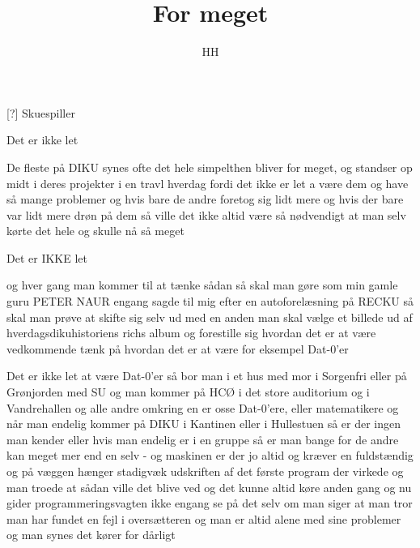\documentclass[a4paper,11pt]{article}
\title{For meget}
\author{HH}
\begin{document}
\maketitle

\begin{roles}
[?] Skuespiller 
\end{roles}


\begin{sketch}

 Det er ikke let

         De fleste på DIKU synes ofte det hele simpelthen bliver for
                meget, og standser op midt i deres projekter
                i en travl hverdag fordi det ikke er let a
                være dem og have så mange problemer
         og hvis bare de andre foretog sig lidt mere og hvis der bare
                var lidt mere drøn på dem
         så ville det ikke altid være så nødvendigt at man selv kørte
                det hele og skulle nå så meget

         Det er IKKE let
         
         og hver gang man kommer til at tænke sådan
         så skal man gøre som min gamle guru PETER NAUR engang
                sagde til mig efter en autoforelæsning på RECKU
         så skal man prøve at skifte sig selv ud med en anden
         man skal vælge et billede ud af hverdagsdikuhistoriens
                richs album
         og forestille sig hvordan det er at være vedkommende
         tænk på hvordan det er
         at være for eksempel Dat-0'er

         Det er ikke let at være Dat-0'er
         så bor man i et hus med mor i Sorgenfri
                eller på Grønjorden med SU og man kommer på HCØ
                i det store auditorium og i Vandrehallen
         og alle andre omkring en er osse Dat-0'ere, eller matematikere
         og når man endelig kommer på DIKU
                i Kantinen eller i Hullestuen
         så er der ingen man kender
                eller hvis man endelig er i en gruppe så er man bange
         for de andre kan meget mer end en selv -
         og maskinen er der jo altid og kræver
                en fuldstændig
         og på væggen hænger stadigvæk udskriften af det første
                program der virkede
         og man troede at sådan ville det blive ved
                og det kunne altid køre
                anden gang og nu gider programmeringsvagten ikke engang
                se på det selv om man siger
                at man tror man har fundet en fejl i oversætteren
         og man er altid alene med sine problemer
         og man synes det kører for dårligt


\end{sketch}
\end{document}
